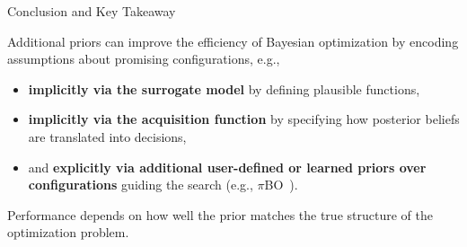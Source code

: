 \documentclass[main]{subfiles}
\begin{document}
\begin{frame}{Conclusion and Key Takeaway}

Additional priors can improve the efficiency of Bayesian optimization by encoding assumptions about promising configurations, e.g., 
\begin{itemize}
    \item \textbf{implicitly via the surrogate model} by defining plausible functions,
    \item \textbf{implicitly via the acquisition function} by specifying how posterior beliefs are translated into decisions,
    \item and \textbf{explicitly via additional user-defined or learned priors over configurations} guiding the search (e.g., $\pi$BO~).
\end{itemize}

\vspace{0.5cm}

Performance depends on how well the prior matches the true structure of the optimization problem.
\end{frame}
\end{document}
